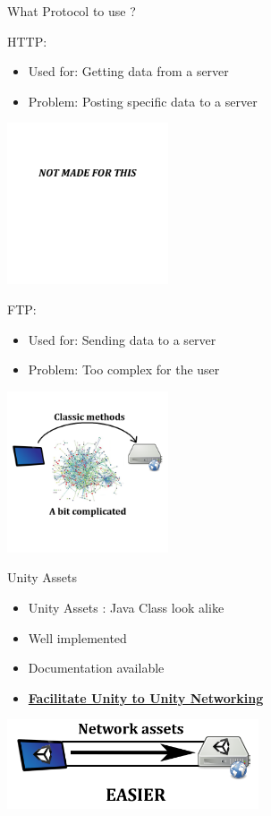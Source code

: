 \documentclass[a4paper,10pt]{beamer}
\begin{document}
			\begin{frame}{What Protocol to use ?}
					\begin{multicols}{2}
						HTTP:
						\begin{itemize}
							\item Used for: Getting data from a server
							\item Problem: Posting specific data to a server
						\end{itemize}
						\pause
						
						\includegraphics[height=135pt]{images/network/nmft.png}
						\pause
						
						\columnbreak
						FTP:
						\begin{itemize}
							\item Used for: Sending data to a server
							\item Problem: Too complex for the user
						\end{itemize}
						\pause
						
						\includegraphics[height=135pt]{images/network/classicnet.png}
					\end{multicols}
					
			\end{frame}
			
		\begin{frame}{Unity Assets}
			\begin{itemize}
				\item Unity Assets : Java Class look alike
				\item Well implemented
				\item Documentation available
				\pause
				\item \textbf{\underline{Facilitate Unity to Unity Networking}}
			\end{itemize}
			\centerline{\includegraphics[height=75pt]{images/network/easier.png}}
		\end{frame}
		
\end{document}
